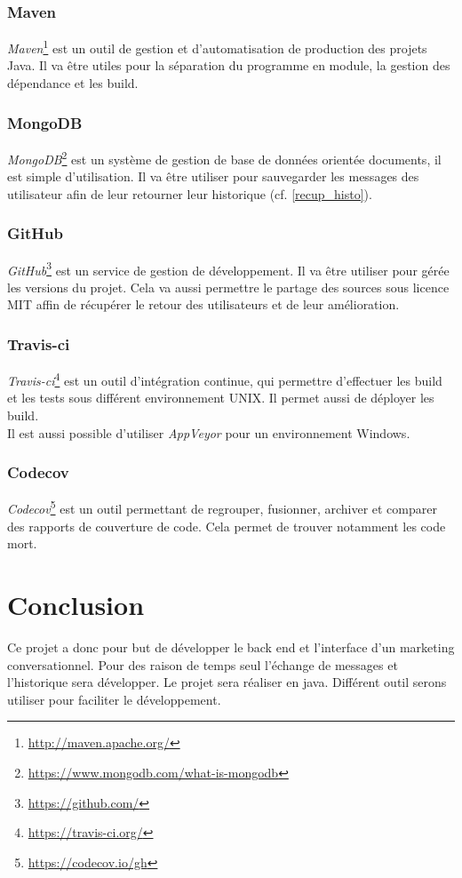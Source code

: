 \documentclass[12pt]{article}
\begin{document}
\subsubsection{Maven}
\textit{Maven}\footnote{\url{http://maven.apache.org/}} est un outil de gestion et d'automatisation de production des projets Java. Il va être utiles pour la séparation du programme en module, la gestion des dépendance et les build.

\subsubsection{MongoDB}
\textit{MongoDB}\footnote{\url{https://www.mongodb.com/what-is-mongodb}} est un système de gestion de base de données orientée documents, il est simple d'utilisation. Il va être utiliser pour sauvegarder les messages des utilisateur afin de leur retourner leur historique (cf. \ref{recup_histo}).

\subsubsection{GitHub}
\textit{GitHub}\footnote{\url{https://github.com/}} est un service de gestion de développement. Il va être utiliser pour gérée les versions du projet. Cela va aussi permettre le partage des sources sous licence MIT affin de récupérer le retour des utilisateurs et de leur amélioration.

\subsubsection{Travis-ci}
\textit{Travis-ci}\footnote{\url{https://travis-ci.org/}} est un outil d'intégration continue, qui permettre d'effectuer les build et les tests sous différent environnement UNIX. Il permet aussi de déployer les build.\\
Il est aussi possible d'utiliser \textit{AppVeyor} pour un environnement Windows.

\subsubsection{Codecov}
\textit{Codecov}\footnote{\url{https://codecov.io/gh}} est un outil permettant de regrouper, fusionner, archiver et comparer des rapports de couverture de code. Cela permet de trouver notamment les code mort.


\section{Conclusion}
Ce projet a donc pour but de développer le back end et l'interface d'un marketing conversationnel. Pour des raison de temps seul l'échange de messages et l'historique sera développer. Le projet sera réaliser en java. Différent outil serons utiliser pour faciliter le développement.
\end{document}
